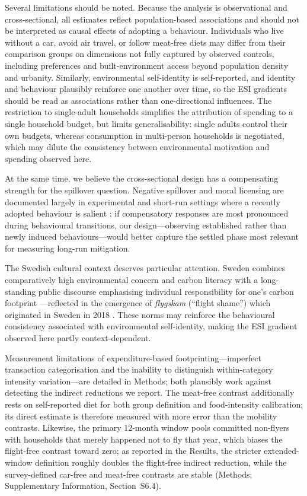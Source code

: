 \documentclass[sn-nature]{sn-jnl}
\begin{document}
Several limitations should be noted. Because the analysis is observational and cross-sectional, all estimates reflect population-based associations and should not be interpreted as causal effects of adopting a behaviour. Individuals who live without a car, avoid air travel, or follow meat-free diets may differ from their comparison groups on dimensions not fully captured by observed controls, including preferences and built-environment access beyond population density and urbanity. Similarly, environmental self-identity is self-reported, and identity and behaviour plausibly reinforce one another over time, so the ESI gradients should be read as associations rather than one-directional influences. The restriction to single-adult households simplifies the attribution of spending to a single household budget, but limits generalisability: single adults control their own budgets, whereas consumption in multi-person households is negotiated, which may dilute the consistency between environmental motivation and spending observed here.

At the same time, we believe the cross-sectional design has a compensating strength for the spillover question. Negative spillover and moral licensing are documented largely in experimental and short-run settings where a recently adopted behaviour is salient \citep{Merritt2010,Blanken2015}; if compensatory responses are most pronounced during behavioural transitions, our design---observing established rather than newly induced behaviours---would better capture the settled phase most relevant for measuring long-run mitigation.

The Swedish cultural context deserves particular attention. Sweden combines comparatively high environmental concern and carbon literacy with a long-standing public discourse emphasising individual responsibility for one’s carbon footprint \citep{eib_climate_2021,naturvardsverket_2023,oecd_sweden_2025}---reflected in the emergence of \textit{flygskam} (``flight shame'') which originated in Sweden in 2018 \citep{wolrath2019grounded}. These norms may reinforce the behavioural consistency associated with environmental self-identity, making the ESI gradient observed here partly context-dependent. 

Measurement limitations of expenditure-based footprinting---imperfect transaction categorisation and the inability to distinguish within-category intensity variation---are detailed in Methods; both plausibly work against detecting the indirect reductions we report. The meat-free contrast additionally rests on self-reported diet for both group definition and food-intensity calibration; its direct estimate is therefore measured with more error than the mobility contrasts. Likewise, the primary 12-month window pools committed non-flyers with households that merely happened not to fly that year, which biases the flight-free contrast toward zero; as reported in the Results, the stricter extended-window definition roughly doubles the flight-free indirect reduction, while the survey-defined car-free and meat-free contrasts are stable (Methods; Supplementary Information, Section~S6.4).
\end{document}
